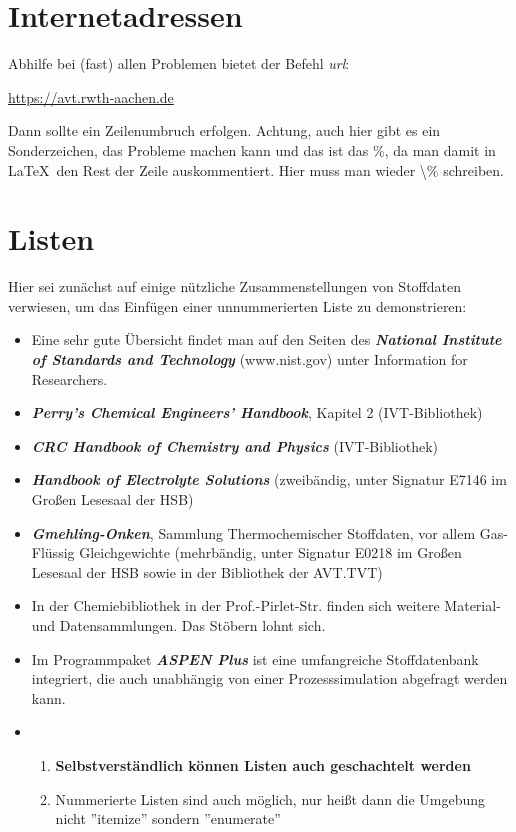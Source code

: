 \section{Internetadressen}

Abhilfe bei (fast) allen Problemen bietet der Befehl \emph{url}:

\url{https://avt.rwth-aachen.de}

Dann sollte ein Zeilenumbruch erfolgen. Achtung, auch hier gibt es ein Sonderzeichen, das Probleme machen kann und das ist das \%, da man damit in \LaTeX\ den Rest der Zeile auskommentiert. Hier muss man wieder \textbackslash \% schreiben.

\section {Listen}
Hier sei zunächst auf einige nützliche Zusammenstellungen von
Stoffdaten verwiesen, um das Einfügen einer unnummerierten Liste
zu demonstrieren:
\begin{itemize}
    \item Eine sehr gute Übersicht findet man auf den Seiten des \emph{\textbf{National Institute of Standards and Technology}} (www.nist.gov) unter Information for Researchers.
    \item \emph{\textbf{Perry's Chemical Engineers' Handbook}}, Kapitel 2 (IVT-Bibliothek)
    \item \emph{\textbf{CRC Handbook of Chemistry and Physics}} (IVT-Bibliothek)
    \item \emph{\textbf{Handbook of Electrolyte Solutions}} (zweibändig, unter Signatur E7146 im Großen Lesesaal der HSB)
    \item \emph{\textbf{Gmehling-Onken}}, Sammlung Thermochemischer Stoffdaten, vor allem Gas-Flüssig Gleichgewichte (mehrbändig, unter Signatur E0218 im Großen Lesesaal der HSB sowie in der Bibliothek der AVT.TVT)
    \item In der Chemiebibliothek in der Prof.-Pirlet-Str. finden sich weitere Material- und Datensammlungen. Das Stöbern lohnt sich.
    \item Im Programmpaket \emph{\textbf{ASPEN Plus}} ist eine umfangreiche Stoffdatenbank integriert, die auch unabhängig von einer Prozesssimulation abgefragt werden kann.
    \item \begin{enumerate}
        \item \textbf{Selbstverständlich können Listen auch geschachtelt
        werden}
        \item Nummerierte Listen sind auch möglich, nur heißt dann die Umgebung nicht ''itemize'' sondern ''enumerate''
    \end{enumerate}

\end{itemize}

